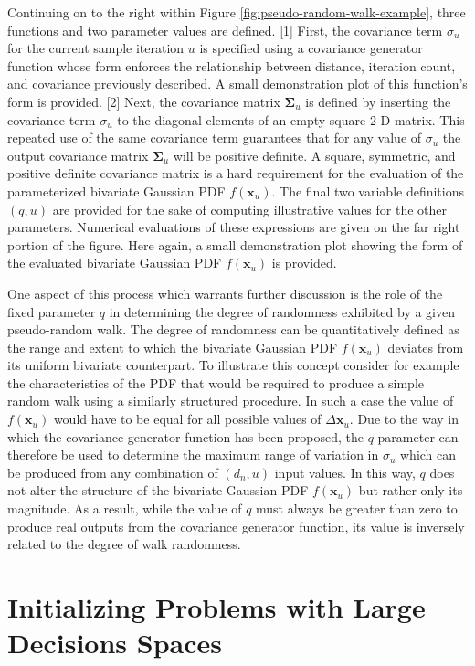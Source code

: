 Continuing on to the right within Figure \ref{fig:pseudo-random-walk-example}, three functions and two parameter values are defined. [1] First, the covariance term $\sigma_u$ for the current sample iteration $u$ is specified using a covariance generator function whose form enforces the relationship between distance, iteration count, and covariance previously described. A small demonstration plot of this function's form is provided. [2] Next, the covariance matrix $\boldsymbol\Sigma_u$ is defined by inserting the covariance term $\sigma_u$ to the diagonal elements of an empty square 2-D matrix. This repeated use of the same covariance term guarantees that for any value of $\sigma_u$ the output covariance matrix $\boldsymbol\Sigma_u$ will be positive definite. A square, symmetric, and positive definite covariance matrix is a hard requirement for the evaluation of the parameterized bivariate Gaussian PDF $f(\textbf{x}_u)$. The final two variable definitions $(q,u)$ are provided for the sake of computing illustrative values for the other parameters. Numerical evaluations of these expressions are given on the far right portion of the figure. Here again, a small demonstration plot showing the form of the evaluated bivariate Gaussian PDF $f(\textbf{x}_u)$ is provided.

One aspect of this process which warrants further discussion is the role of the fixed parameter $q$ in determining the degree of randomness exhibited by a given pseudo-random walk. The degree of randomness can be quantitatively defined as the range and extent to which the bivariate Gaussian PDF $f(\textbf{x}_u)$ deviates from its uniform bivariate counterpart. To illustrate this concept consider for example the characteristics of the PDF that would be required to produce a simple random walk using a similarly structured procedure. In such a case the value of $f(\textbf{x}_u)$ would have to be equal for all possible values of $\Delta\textbf{x}_u$. Due to the way in which the covariance generator function has been proposed, the $q$ parameter can therefore be used to determine the maximum range of variation in $\sigma_u$ which can be produced from any combination of $(d_n,u)$ input values. In this way, $q$ does not alter the structure of the bivariate Gaussian PDF $f(\textbf{x}_u)$ but rather only its magnitude. As a result, while the value of $q$ must always be greater than zero to produce real outputs from the covariance generator function, its value is inversely related to the degree of walk randomness. 

\section{Initializing Problems with Large Decisions Spaces}
    
